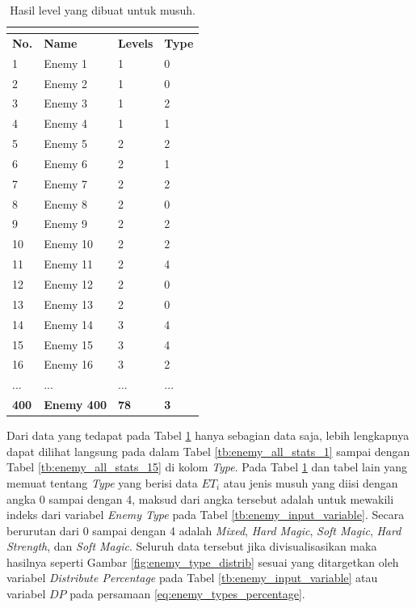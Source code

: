 \begin{longtable}{|l|l|l|l|}
	\caption{Hasil level yang dibuat untuk musuh.}
	\vspace{1ex}
	\label{tb:enemy_type_distrib}\\
	\hline
	\rowcolor[HTML]{C0C0C0} 
	\textbf{No.} & \textbf{Name} & \textbf{Levels} & \textbf{Type} \\ \hline
	1 & Enemy 1 & 1 & 0 \\ \hline
	2 & Enemy 2 & 1 & 0 \\ \hline
	3 & Enemy 3 & 1 & 2 \\ \hline
	4 & Enemy 4 & 1 & 1 \\ \hline
	5 & Enemy 5 & 2 & 2 \\ \hline
	6 & Enemy 6 & 2 & 1 \\ \hline
	7 & Enemy 7 & 2 & 2 \\ \hline
	8 & Enemy 8 & 2 & 0 \\ \hline
	9 & Enemy 9 & 2 & 2 \\ \hline
	10 & Enemy 10 & 2 & 2 \\ \hline
	11 & Enemy 11 & 2 & 4 \\ \hline
	12 & Enemy 12 & 2 & 0 \\ \hline
	13 & Enemy 13 & 2 & 0 \\ \hline
	14 & Enemy 14 & 3 & 4 \\ \hline
	15 & Enemy 15 & 3 & 4 \\ \hline
	16 & Enemy 16 & 3 & 2 \\ \hline
	... & ... & ... & ... \\ \hline
	\textbf{400} & \textbf{Enemy 400} & \textbf{78} & \textbf{3} \\ \hline
\end{longtable}

Dari data yang tedapat pada Tabel \ref{tb:enemy_type_distrib} hanya sebagian data saja, lebih lengkapnya dapat dilihat langsung pada  dalam Tabel \ref{tb:enemy_all_stats_1} sampai dengan Tabel \ref{tb:enemy_all_stats_15} di kolom \textit{Type}. Pada Tabel \ref{tb:enemy_type_distrib} dan tabel lain yang memuat tentang \textit{Type} yang berisi data $ET_{i}$ atau jenis musuh yang diisi dengan angka 0 sampai dengan 4, maksud dari angka tersebut adalah untuk mewakili indeks dari variabel \textit{Enemy Type} pada Tabel \ref{tb:enemy_input_variable}. Secara berurutan dari 0 sampai dengan 4 adalah \textit{Mixed}, \textit{Hard Magic}, \textit{Soft Magic}, \textit{Hard Strength}, dan \textit{Soft Magic}. Seluruh data tersebut jika divisualisasikan maka hasilnya seperti Gambar \ref{fig:enemy_type_distrib} sesuai yang ditargetkan oleh variabel \textit{Distribute Percentage} pada Tabel \ref{tb:enemy_input_variable} atau variabel $DP$ pada persamaan \ref{eq:enemy_types_percentage}.

